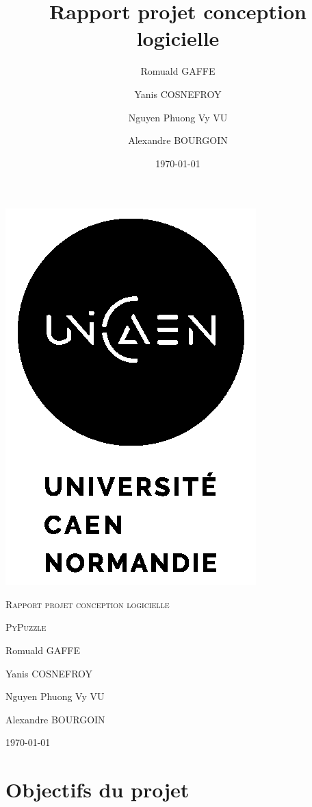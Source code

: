 \documentclass[a4paper]{report}
\title{Rapport projet conception logicielle}
\author{Romuald GAFFE\and Yanis COSNEFROY\and Nguyen Phuong Vy VU\and Alexandre BOURGOIN}
\date{\today}
\begin{document}
\begin{titlepage}
    \centering
    \includegraphics{images/logounicaen.png}\par\vspace{1cm}
    {\scshape\LARGE Rapport projet conception logicielle \par}
    \vspace{1cm}
    {\scshape\Large PyPuzzle\par}
    \vspace{1cm}
	{\Large Romuald GAFFE\par}
	{\Large Yanis COSNEFROY\par}
	{\Large Nguyen Phuong Vy VU\par}
	{\Large Alexandre BOURGOIN\par}
    \vspace{1cm}
	{\large \today \par}
\end{titlepage}

\tableofcontents
\part{Objectifs du projet}
\end{document}
